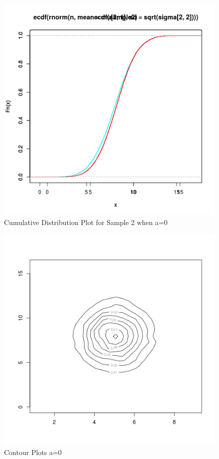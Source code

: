 \documentclass{article}
\begin{document}
  			\begin{figure}[!ht]
  			\includegraphics[width=\linewidth]{pic/cdf_sample2_2.png}
 			 \caption{Cumulative Distribution Plot for Sample 2 when a=0}
  			\label{fig:hist1_1}
  			\end{figure}
  			
  			\begin{figure}[!ht]
  			\includegraphics[width=\linewidth]{pic/contour_plot_2.png}
 			 \caption{Contour Plots a=0}
  			\label{fig:hist1_1}
  			\end{figure}
  			
\end{document}
